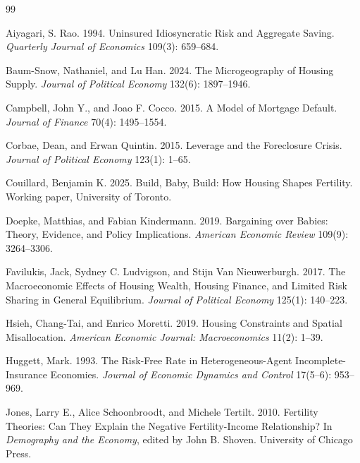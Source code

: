 \documentclass[11pt]{article}
\begin{document}
\begin{thebibliography}{99}

Aiyagari, S. Rao. 1994.
Uninsured Idiosyncratic Risk and Aggregate Saving.
\emph{Quarterly Journal of Economics} 109(3): 659--684.

Baum-Snow, Nathaniel, and Lu Han. 2024.
The Microgeography of Housing Supply.
\emph{Journal of Political Economy} 132(6): 1897--1946.

Campbell, John Y., and Joao F. Cocco. 2015.
A Model of Mortgage Default.
\emph{Journal of Finance} 70(4): 1495--1554.

Corbae, Dean, and Erwan Quintin. 2015.
Leverage and the Foreclosure Crisis.
\emph{Journal of Political Economy} 123(1): 1--65.

Couillard, Benjamin K. 2025.
Build, Baby, Build: How Housing Shapes Fertility.
Working paper, University of Toronto.

Doepke, Matthias, and Fabian Kindermann. 2019.
Bargaining over Babies: Theory, Evidence, and Policy Implications.
\emph{American Economic Review} 109(9): 3264--3306.

Favilukis, Jack, Sydney C. Ludvigson, and Stijn Van Nieuwerburgh. 2017.
The Macroeconomic Effects of Housing Wealth, Housing Finance, and Limited Risk Sharing in General Equilibrium.
\emph{Journal of Political Economy} 125(1): 140--223.

Hsieh, Chang-Tai, and Enrico Moretti. 2019.
Housing Constraints and Spatial Misallocation.
\emph{American Economic Journal: Macroeconomics} 11(2): 1--39.

Huggett, Mark. 1993.
The Risk-Free Rate in Heterogeneous-Agent Incomplete-Insurance Economies.
\emph{Journal of Economic Dynamics and Control} 17(5--6): 953--969.

Jones, Larry E., Alice Schoonbroodt, and Michele Tertilt. 2010.
Fertility Theories: Can They Explain the Negative Fertility-Income Relationship?
In \emph{Demography and the Economy}, edited by John B. Shoven. University of Chicago Press.


\end{thebibliography}
\end{document}
